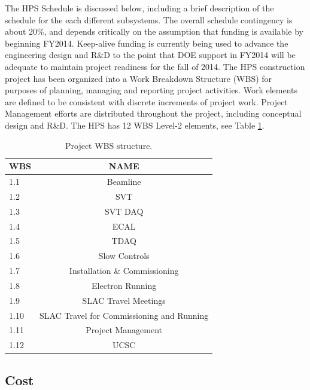 The HPS Schedule is discussed below, including a brief description of the schedule for the each 
different subsystems. The overall schedule contingency is about 20\%, and depends critically on the assumption that 
funding is available by beginning FY2014. Keep-alive funding is currently being used to advance the engineering design and R\&D to the point
that DOE support in FY2014 will be adequate to maintain project readiness for the fall of 2014. The HPS construction project has been organized 
into a Work Breakdown Structure (WBS) for purposes of planning, 
managing and reporting project activities. Work elements are defined to be consistent with discrete increments of project work. 
Project Management efforts are distributed throughout the project, including conceptual design and R\&D. The HPS has 12 WBS
 Level-2 elements, see Table \ref{tb:wbs_categories}. 

\begin{table}[htdp]
\caption{Project WBS structure.}
\begin{center}
\begin{tabular}{|l|c|}
\hline
WBS& NAME \\
\hline\hline
1.1 & Beamline \\
\hline
1.2 & SVT \\
\hline
1.3 & SVT DAQ \\
\hline
1.4 & ECAL \\
\hline
1.5 & TDAQ \\
\hline
1.6 & Slow Controls \\
\hline
1.7 & Installation \& Commissioning \\
\hline
1.8 & Electron Running \\
\hline
1.9 & SLAC Travel Meetings \\
\hline
1.10 & SLAC Travel for Commissioning and Running \\
\hline
1.11 & Project Management  \\
\hline
1.12 & UCSC  \\
\hline
\hline
\end{tabular}
\end{center}
\label{tb:wbs_categories}
\end{table}%

\subsection{Cost}

